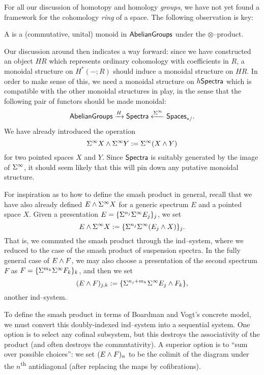 For all our discussion of homotopy and homology \emph{groups}, we have not yet found a framework for the cohomology \emph{ring} of a space.
The following observation is key:

\begin{definition}
A  is a (commutative, unital) monoid in $\mathsf{AbelianGroups}$ under the $\otimes$--product.%
\end{definition}

Our discussion around  then indicates a way forward: since we have constructed an object $HR$ which represents ordinary cohomology with coefficients in $R$, a monoidal structure on $H^*(-; R)$ should induce a monoidal structure on $HR$.%
In order to make sense of this, we need a monoidal structure on $h\mathsf{Spectra}$ which is compatible with the other monoidal structures in play, in the sense that the following pair of functors should be made monoidal: \[\mathsf{AbelianGroups} \xrightarrow H \mathsf{Spectra} \xleftarrow{\Sigma^\infty} \mathsf{Spaces}_{*/}.\]
We have already introduced the operation \[\Sigma^\infty X \wedge \Sigma^\infty Y := \Sigma^\infty(X \wedge Y)\] for two pointed spaces $X$ and $Y$.
Since $\mathsf{Spectra}$ is suitably generated by the image of $\Sigma^\infty$, it should seem likely that this will pin down any putative monoidal structure.

For inspiration as to how to define the smash product in general, recall that we have also already defined $E \wedge \Sigma^\infty X$ for a generic spectrum $E$ and a pointed space $X$.
Given a presentation $E = \{\Sigma^{n_j} \Sigma^\infty E_j\}_j$, we set \[E \wedge \Sigma^\infty X := \{\Sigma^{n_j} \Sigma^\infty (E_j \wedge X)\}_j.\]
That is, we commuted the smash product through the ind--system, where we reduced to the case of the smash product of suspension spectra.
In the fully general case of $E \wedge F$, we may also choose a presentation of the second spectrum $F$ as $F = \{\Sigma^{m_k} \Sigma^\infty F_k\}_k$, and then we set \[(E \wedge F)_{j,k} := \{\Sigma^{n_j + m_k} \Sigma^\infty E_j \wedge F_k\},\] another ind--system.

\begin{remark}
To define the smash product in terms of Boardman and Vogt's concrete model, we must convert this doubly-indexed ind--system into a sequential system.
One option is to select any cofinal subsystem, but this destroys the associativity of the product (and often destroys the commutativity).
A superior option is to ``sum over possible choices'': we set $(E \wedge F)_n$ to be the colimit of the diagram under the $n$\textsuperscript{th} antidiagonal (after replacing the maps by cofibrations).
\end{remark}

